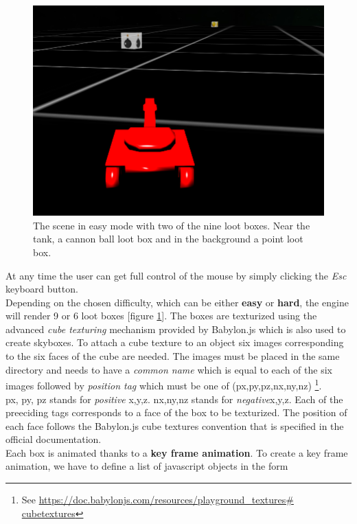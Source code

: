 \documentclass[14pt]{article}
\begin{document}
\begin{figure}[H]
\center
\includegraphics[width = 12cm]{images/lootBoxes.png}
\caption{The scene in easy mode with two of the nine loot boxes. Near the tank, a cannon ball loot box and in the background a point loot box.}
\label{img:lootBoxes}
\end{figure}

At any time the user can get full control of the mouse by simply clicking the \textit{Esc} keyboard button.\\
Depending on the chosen difficulty, which can be either \textbf{easy} or \textbf{hard}, the engine will render 9 or 6 loot boxes [figure \ref{img:lootBoxes}]. The boxes are texturized using the advanced \textit{cube texturing} mechanism provided by Babylon.js which is also used to create skyboxes. To attach a cube texture to an object six images corresponding to the six faces of the cube are needed. The images must be placed in the same directory and needs to have a \textit{common name} which is equal to each of the six images followed by \textit{position tag} which must be one of (px,py,pz,nx,ny,nz) \footnote{See \url{https://doc.babylonjs.com/resources/playground_textures\# cubetextures}}. \\
px, py, pz stands for \textit{positive} x,y,z. nx,ny,nz stands for \textit{negative}x,y,z. Each of the preeciding tags corresponds to a face of the box to be texturized. The position of each face follows the Babylon.js cube textures convention that is specified in the official documentation.\\
Each box is animated thanks to a \textbf{key frame animation}.
To create a key frame animation, we have to define a list of javascript objects in the form 
\end{document}

